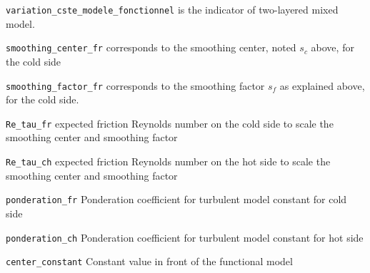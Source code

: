 \texttt{variation\_cste\_modele\_fonctionnel} is the indicator of two-layered mixed model.

\texttt{smoothing\_center\_fr} corresponds to the smoothing center, noted $s_c$ above, for the cold side

\texttt{smoothing\_factor\_fr} corresponds to the smoothing factor $s_f$ as explained above, for the cold side.

\texttt{Re\_tau\_fr} expected friction Reynolds number on the cold side to scale the smoothing center and smoothing factor

\texttt{Re\_tau\_ch} expected friction Reynolds number on the hot side to scale the smoothing center and smoothing factor

\texttt{ponderation\_fr} Ponderation coefficient for turbulent model constant for cold side

\texttt{ponderation\_ch} Ponderation coefficient for turbulent model constant for hot side

\texttt{center\_constant} Constant value in front of the functional model
